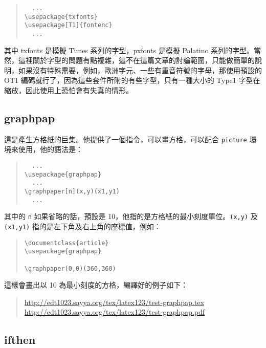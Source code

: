 \begin{quote}
  \begin{verbatim}
  ...
\usepackage{txfonts}
\usepackage[T1]{fontenc}
  ...
\end{verbatim}
\end{quote}

其中 \textsf{txfonts} 是模擬 Times 系列的字型，\textsf{pxfonts} 是模擬 Palatino 系列的字型。當然，這裡關於字型的問題有點複雜，這不在這篇文章的討論範圍，只能做簡單的說明，如果沒有特殊需要，例如，歐洲字元、一些有重音符號的字母，那使用預設的 OT1 編碼就行了，因為這些套件所附的有些字型，只有一種大小的 Type1 字型在縮放，因此使用上恐怕會有失真的情形。

\subsection{graphpap}

這是產生方格紙的巨集。他提供了一個指令，可以畫方格，可以配合 \texttt{picture} 環境來使用，他的語法是：

\begin{quote}
  \begin{verbatim}
  ...
\usepackage{graphpap}
  ...
\graphpaper[n](x,y)(x1,y1)
  ...
\end{verbatim}
\end{quote}

其中的 \texttt{n} 如果省略的話，預設是 10，他指的是方格紙的最小刻度單位。\texttt{(x,y)} 及 \texttt{(x1,y1)} 指的是左下角及右上角的座標值，例如：

\begin{quote}
  \begin{verbatim}
\documentclass{article}
\usepackage{graphpap}

\graphpaper(0,0)(360,360)

\end{verbatim}
\end{quote}

這樣會畫出以 10 為最小刻度的方格，編譯好的例子如下：

\begin{quote}
  \url{http://edt1023.sayya.org/tex/latex123/test-graphpap.tex}\\
  \url{http://edt1023.sayya.org/tex/latex123/test-graphpap.pdf}
\end{quote}

\subsection{ifthen}


